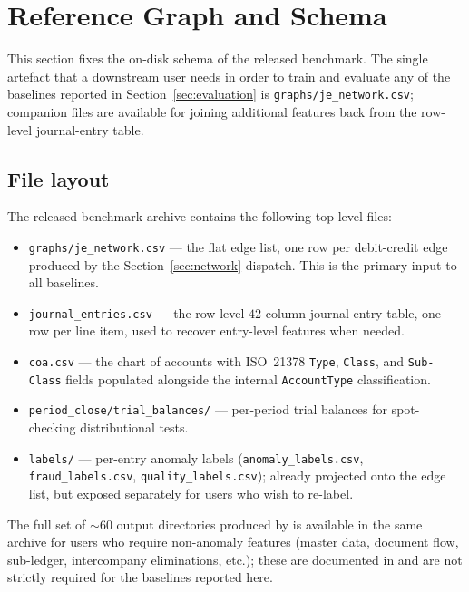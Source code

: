 \section{Reference Graph and Schema}
\label{sec:graph}

This section fixes the on-disk schema of the released benchmark.
The single artefact that a downstream user needs in order to train
and evaluate any of the baselines reported in
Section~\ref{sec:evaluation} is
\texttt{graphs/je\_network.csv}; companion files are available for
joining additional features back from the row-level journal-entry
table.

\subsection{File layout}
\label{sec:graph:layout}

The released benchmark archive contains the following top-level
files:

\begin{itemize}
  \item \texttt{graphs/je\_network.csv} --- the flat edge list,
    one row per debit-credit edge produced by the
    Section~\ref{sec:network} dispatch.  This is the primary input
    to all baselines.
  \item \texttt{journal\_entries.csv} --- the row-level
    $42$-column journal-entry table, one row per line item, used
    to recover entry-level features when needed.
  \item \texttt{coa.csv} --- the chart of accounts with ISO~21378
    \texttt{Type}, \texttt{Class}, and \texttt{Sub-Class} fields
    populated alongside the internal \texttt{AccountType}
    classification.
  \item \texttt{period\_close/trial\_balances/} --- per-period
    trial balances for spot-checking distributional tests.
  \item \texttt{labels/} --- per-entry anomaly labels
    (\texttt{anomaly\_labels.csv}, \texttt{fraud\_labels.csv},
    \texttt{quality\_labels.csv}); already projected onto the edge
    list, but exposed separately for users who wish to re-label.
\end{itemize}

The full set of $\sim$$60$ output directories produced by
\system{} is available in the same archive for users who require
non-anomaly features (master data, document flow, sub-ledger,
intercompany eliminations, etc.); these are documented in
\citep{ivertowski2026datasynth} and are not strictly required for
the baselines reported here.

